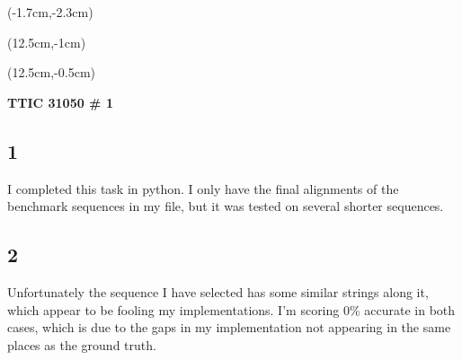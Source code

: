 \documentclass[12pt, oneside]{article}
\begin{document}

\begin{textblock*}{4cm}(-1.7cm,-2.3cm)
\end{textblock*}

\begin{textblock*}{8cm}(12.5cm,-1cm)
\end{textblock*}
\begin{textblock*}{3cm}(12.5cm,-0.5cm)
\end{textblock*}

\vspace{1cm}

\begin{center}
\textbf{\Large TTIC 31050 \# 1}
\end{center}


\subsection*{1}
I completed this task in python. I only have the final alignments of the benchmark sequences in my file, but it was tested on several shorter sequences.



\subsection*{2}
Unfortunately the sequence I have selected has some similar strings along it, which appear to be fooling my implementations. I'm scoring 0\% accurate in both cases, which is due to the gaps in my implementation not appearing in the same places as the ground truth.
\end{document}
